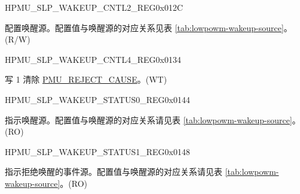 \begin{register}{H}{PMU\_SLP\_WAKEUP\_CNTL2\_REG}{0x012C}\label{regdesc:PMUSLPWAKEUPCNTL2REG}
%
\regnewline%
\begin{regdesc}\begin{reglist}
\label{fielddesc:PMUWAKEUPENA}\item [PMU\_WAKEUP\_ENA] 配置唤醒源。配置值与唤醒源的对应关系见表 \ref{tab:lowpowm-wakeup-source}。\\ (R/W)
\end{reglist}\end{regdesc}
\end{register}


\begin{register}{H}{PMU\_SLP\_WAKEUP\_CNTL4\_REG}{0x0134}\label{regdesc:PMUSLPWAKEUPCNTL4REG}
%
%
\regnewline%
\begin{regdesc}\begin{reglist}
\label{fielddesc:PMUSLPREJECTCAUSECLR}\item [PMU\_SLP\_REJECT\_CAUSE\_CLR] 写 1 清除 \hyperref[fielddesc:PMUREJECTCAUSE]{PMU\_REJECT\_CAUSE}。(WT)
\end{reglist}\end{regdesc}
\end{register}


\begin{register}{H}{PMU\_SLP\_WAKEUP\_STATUS0\_REG}{0x0144}\label{regdesc:PMUSLPWAKEUPSTATUS0REG}
%
\regnewline%
\begin{regdesc}\begin{reglist}
\label{fielddesc:PMUWAKEUPCAUSE}\item [PMU\_WAKEUP\_CAUSE] 指示唤醒源。配置值与唤醒源的对应关系请见表 \ref{tab:lowpowm-wakeup-source}。(RO)
\end{reglist}\end{regdesc}
\end{register}

\begin{register}{H}{PMU\_SLP\_WAKEUP\_STATUS1\_REG}{0x0148}\label{regdesc:PMUSLPWAKEUPSTATUS1REG}
%
\regnewline%
\begin{regdesc}\begin{reglist}
\label{fielddesc:PMUREJECTCAUSE}\item [PMU\_REJECT\_CAUSE] 指示拒绝唤醒的事件源。配置值与唤醒源的对应关系请见表 \ref{tab:lowpowm-wakeup-source}。(RO)
\end{reglist}\end{regdesc}
\end{register}


